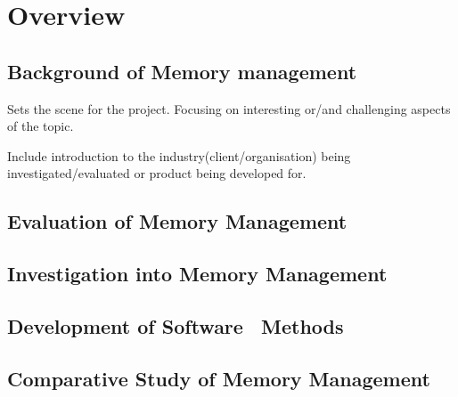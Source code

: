 \chapter{Overview}

\section{Background of Memory management}
Sets  the scene for the project.
Focusing on interesting or/and challenging aspects of the topic.

Include introduction to the industry(client/organisation) 
being investigated/evaluated or product being developed for.
\section{Evaluation of Memory Management}
\section{Investigation into Memory Management}
\section{Development of Software \ Methods}
\section{Comparative Study of Memory Management}